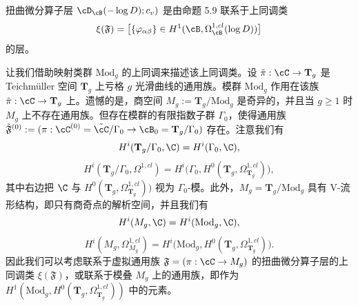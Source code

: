 \begin{definition}[5.12]
 扭曲微分算子层 $\cD_\cB(-\log D);c_v)$ 是由命题 5.9 联系于上同调类
 \[
  \xi(\mathfrak F)=\big[\{\varphi_{\alpha\beta}\}\in H^1(\cB,\Omega^{1,cl}_\cB(\log D))\big]
 \]
 的层。
\end{definition}

让我们借助映射类群 $\mathrm{Mod}_g$ 的上同调来描述该上同调类。设 $\tilde\pi:\cC\to\mathbf T_g$ 是 Teichmüller 空间 $\mathbf T_g$ 上亏格 $g$ 光滑曲线的通用族。模群 $\mathrm{Mod}_g$ 作用在该族 $\tilde\pi:\cC\to\mathbf T_g$ 上。遗憾的是，商空间 $M_g:=\mathbf T_g/\mathrm{Mod}_g$ 是奇异的，并且当 $g\ge1$ 时 $M_g$ 上不存在通用族。但存在模群的有限指数子群 $\Gamma_0$，使得通用族 $\tilde{\mathfrak F}^{(0)}:=(\pi:\cC^{(0)}=\tilde\cC/\Gamma_0\to\cB_0=\mathbf T_g/\Gamma_0)$ 存在。注意我们有
\[
 H^i(\mathbf T_g/\Gamma_0,\C)=H^i(\Gamma_0,\C),
\]
\[
 H^i(\mathbf T_g/\Gamma_0,\Omega^{1,cl})=H^i\big(\Gamma_0,
 H^0(\mathbf T_g,\Omega^{1,cl}_{\mathbf T_g})\big),
\]
其中右边把 $\C$ 与 $H^0(\mathbf T_g,\Omega^{1,cl}_{\mathbf T_g}))$ 视为 $\Gamma_0$-模。此外，$M_g=\mathbf T_g/\mathrm{Mod}_g$ 具有 V-流形结构，即只有商奇点的解析空间，并且我们有
\[
 H^i(M_g,\C)=H^i(\mathrm{Mod}_g,\C),
\]
\[
 H^i(M_g,\Omega^{1,cl}_{M_g})=H^i\big(\mathrm{Mod}_g,
 H^0(\mathbf T_g,\Omega^{1,cl}_{\mathbf T_g})\big).
\]
因此我们可以考虑联系于虚拟通用族 $\mathfrak F=(\pi:\cC\to M_g)$ 的扭曲微分算子层的上同调类 $\xi(\mathfrak F)$，或联系于模叠 $M_g$ 上的通用族，即作为 $H^1(\mathrm{Mod}_g,H^0(\mathbf T_g,\Omega^{1,cl}_{\mathbf T_g}))$ 中的元素。


